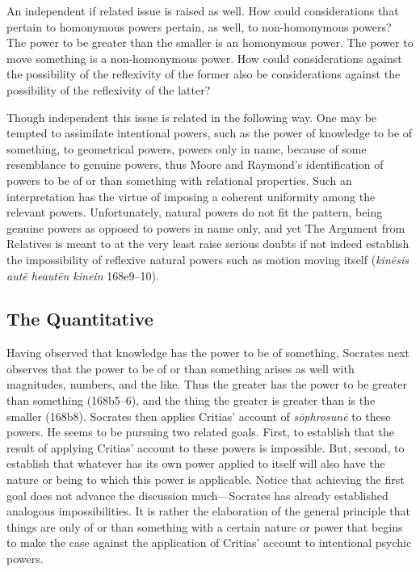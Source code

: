 An independent if related issue is raised as well. How could considerations that pertain to homonymous powers pertain, as well, to non-homonymous powers? The power to be greater than the smaller is an homonymous power. The power to move something is a non-homonymous power. How could considerations against the possibility of the reflexivity of the former also be considerations against the possibility of the reflexivity of the latter?

Though independent this issue is related in the following way. One may be tempted to assimilate intentional powers, such as the power of knowledge to be of something, to geometrical powers, powers only in name, because of some resemblance to genuine powers, thus Moore and Raymond's \citeyearpar[24 n74]{Moore:2019aa} identification of powers to be of or than something with relational properties. Such an interpretation has the virtue of imposing a coherent uniformity among the relevant powers. Unfortunately, natural powers do not fit the pattern, being genuine powers as opposed to powers in name only, and yet The Argument from Relatives is meant to at the very least raise serious doubts if not indeed establish the impossibility of reflexive natural powers such as motion moving itself (\emph{kinēsis autē heautēn kinein} 168e9–10).

\subsection{The Quantitative} %
\label{sub:the_quantitative}

Having observed that knowledge has the power to be of something, Socrates next observes that the power to be of or than something arises as well with magnitudes, numbers, and the like. Thus the greater has the power to be greater than something (168b5–6), and the thing the greater is greater than is the smaller (168b8). Socrates then applies Critias' account of \emph{sōphrosunē} to these powers. He seems to be pursuing two related goals. First, to establish that the result of applying Critias' account to these powers is impossible. But, second, to establish that whatever has its own power applied to itself will also have the nature or being to which this power is applicable. Notice that achieving the first goal does not advance the discussion much—Socrates has already established analogous impossibilities. It is rather the elaboration of the general principle that things are only of or than something with a certain nature or power that begins to make the case against the application of Critias' account to intentional psychic powers.

